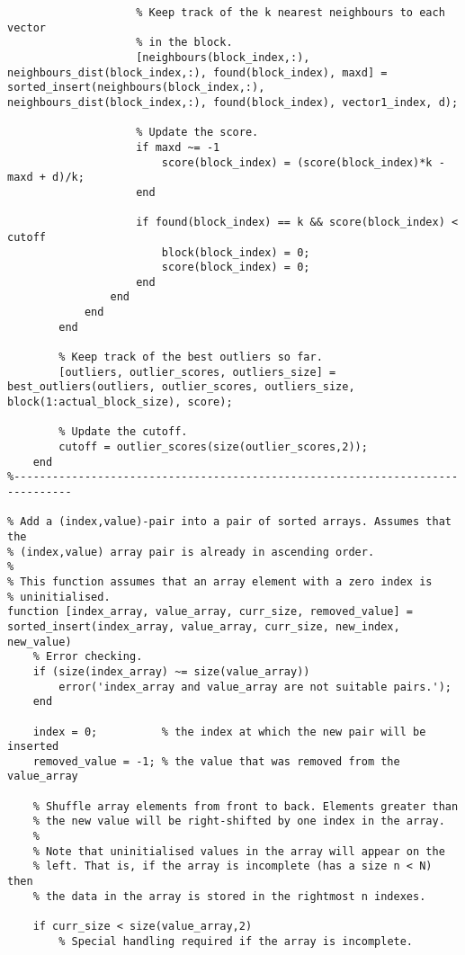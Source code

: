 \begin{lstlisting}
                    % Keep track of the k nearest neighbours to each vector
                    % in the block.
                    [neighbours(block_index,:), neighbours_dist(block_index,:), found(block_index), maxd] = sorted_insert(neighbours(block_index,:), neighbours_dist(block_index,:), found(block_index), vector1_index, d);

                    % Update the score.
                    if maxd ~= -1
                        score(block_index) = (score(block_index)*k - maxd + d)/k;
                    end

                    if found(block_index) == k && score(block_index) < cutoff
                        block(block_index) = 0;
                        score(block_index) = 0;
                    end
                end
            end
        end

        % Keep track of the best outliers so far.
        [outliers, outlier_scores, outliers_size] = best_outliers(outliers, outlier_scores, outliers_size, block(1:actual_block_size), score);

        % Update the cutoff.
        cutoff = outlier_scores(size(outlier_scores,2));
    end
%-------------------------------------------------------------------------------

% Add a (index,value)-pair into a pair of sorted arrays. Assumes that the
% (index,value) array pair is already in ascending order.
%
% This function assumes that an array element with a zero index is
% uninitialised.
function [index_array, value_array, curr_size, removed_value] = sorted_insert(index_array, value_array, curr_size, new_index, new_value)
    % Error checking.
    if (size(index_array) ~= size(value_array))
        error('index_array and value_array are not suitable pairs.');
    end

    index = 0;          % the index at which the new pair will be inserted
    removed_value = -1; % the value that was removed from the value_array

    % Shuffle array elements from front to back. Elements greater than
    % the new value will be right-shifted by one index in the array.
    %
    % Note that uninitialised values in the array will appear on the
    % left. That is, if the array is incomplete (has a size n < N) then
    % the data in the array is stored in the rightmost n indexes.

    if curr_size < size(value_array,2)
        % Special handling required if the array is incomplete.


\end{lstlisting}
